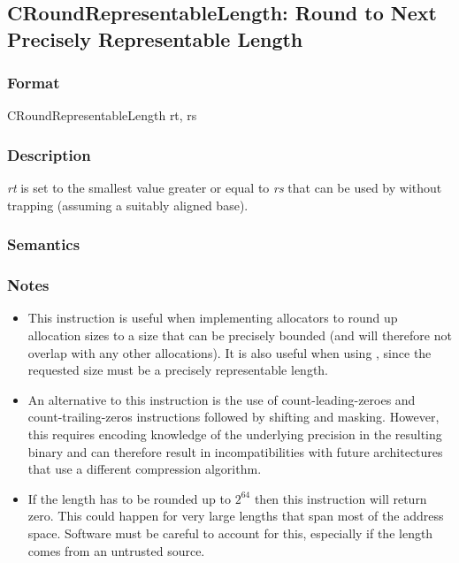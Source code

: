 \clearpage
{}
{}
\subsection*{CRoundRepresentableLength: Round to Next Precisely Representable Length}

\subsubsection*{Format}

CRoundRepresentableLength rt, rs

\begin{center}
\end{center}

\subsubsection*{Description}

\emph{rt} is set to the smallest value greater or equal to \emph{rs} that can be used by  without trapping (assuming a suitably aligned base).

\subsubsection*{Semantics}


\subsubsection*{Notes}

\begin{itemize}
\item This instruction is useful when implementing allocators to round up allocation sizes to a size that can be precisely bounded (and will therefore not overlap with any other allocations). It is also useful when using , since the requested size must be a precisely representable length.
\item An alternative to this instruction is the use of count-leading-zeroes and count-trailing-zeros instructions followed by shifting and masking. However, this requires encoding knowledge of the underlying precision in the resulting binary and can therefore result in incompatibilities with future architectures that use a different compression algorithm.
\item If the length has to be rounded up to $2^{64}$ then this instruction will return zero. This could happen for very large lengths that span most of the address space. Software must be careful to account for this, especially if the length comes from an untrusted source.
\end{itemize}

